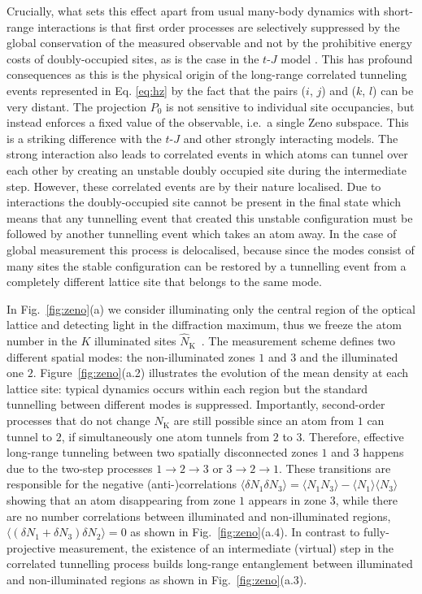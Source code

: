 Crucially, what sets this effect apart from usual many-body dynamics
with short-range interactions is that first order processes are
selectively suppressed by the global conservation of the measured
observable and not by the prohibitive energy costs of doubly-occupied
sites, as is the case in the $t$-$J$ model \cite{auerbach}. This has
profound consequences as this is the physical origin of the long-range
correlated tunneling events represented in Eq. \eqref{eq:hz} by the
fact that the pairs ($i$, $j$) and ($k$, $l$) can be very distant. The
projection $P_0$ is not sensitive to individual site
occupancies, but instead enforces a fixed value of the observable,
i.e.~a single Zeno subspace. This is a striking difference with the
$t$-$J$ and other strongly interacting models. The strong interaction
also leads to correlated events in which atoms can tunnel over each
other by creating an unstable doubly occupied site during the
intermediate step. However, these correlated events are by their
nature localised. Due to interactions the doubly-occupied site cannot
be present in the final state which means that any tunnelling event
that created this unstable configuration must be followed by another
tunnelling event which takes an atom away. In the case of global
measurement this process is delocalised, because since the modes
consist of many sites the stable configuration can be restored by a
tunnelling event from a completely different lattice site that belongs
to the same mode.

In Fig.~\ref{fig:zeno}(a) we consider illuminating only the central
region of the optical lattice and detecting light in the diffraction
maximum, thus we freeze the atom number in the $K$ illuminated sites
$\hat{N}_\text{K}$~\cite{mekhov2009prl,mekhov2009pra}. The measurement
scheme defines two different spatial modes: the non-illuminated zones
$1$ and $3$ and the illuminated one $2$. Figure~\ref{fig:zeno}(a.2)
illustrates the evolution of the mean density at each lattice site:
typical dynamics occurs within each region but the standard tunnelling
between different modes is suppressed. Importantly, second-order
processes that do not change $N_\text{K}$ are still possible since an
atom from $1$ can tunnel to $2$, if simultaneously one atom tunnels
from $2$ to $3$. Therefore, effective long-range tunneling between two
spatially disconnected zones $1$ and $3$ happens due to the two-step
processes $1 \rightarrow 2 \rightarrow 3$ or
$3 \rightarrow 2 \rightarrow 1$. These transitions are responsible for
the negative (anti-)correlations
$\langle \delta N_1 \delta N_3 \rangle = \langle N_1 N_3 \rangle -
\langle N_1 \rangle \langle N_3 \rangle$ showing that an atom
disappearing from zone $1$ appears in zone $3$, while there are no
number correlations between illuminated and non-illuminated regions,
$\langle( \delta N_1 + \delta N_3 ) \delta N_2 \rangle = 0$ as shown
in Fig.~\ref{fig:zeno}(a.4). In contrast to fully-projective
measurement, the existence of an intermediate (virtual) step in the
correlated tunnelling process builds long-range entanglement between
illuminated and non-illuminated regions as shown in
Fig.~\ref{fig:zeno}(a.3).

